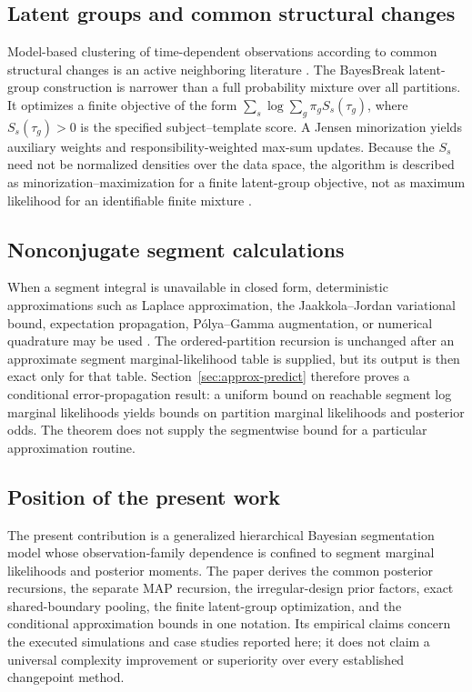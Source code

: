 \subsection{Latent groups and common structural changes}
Model-based clustering of time-dependent observations according to common structural changes is an active neighboring literature \citep{corradin2026commonstructural}. The BayesBreak latent-group construction is narrower than a full probability mixture over all partitions. It optimizes a finite objective of the form $\sum_s\log\sum_g\pi_g S_s(\tau_g)$, where $S_s(\tau_g)>0$ is the specified subject--template score. A Jensen minorization yields auxiliary weights and responsibility-weighted max-sum updates. Because the $S_s$ need not be normalized densities over the data space, the algorithm is described as minorization--maximization for a finite latent-group objective, not as maximum likelihood for an identifiable finite mixture \citep{dempster1977em,teicher1963identifiability}.

\subsection{Nonconjugate segment calculations}
When a segment integral is unavailable in closed form, deterministic approximations such as Laplace approximation, the Jaakkola--Jordan variational bound, expectation propagation, P\'olya--Gamma augmentation, or numerical quadrature may be used \citep{jaakkola2000logisticvb,minka2001ep,polson2013pg}. The ordered-partition recursion is unchanged after an approximate segment marginal-likelihood table is supplied, but its output is then exact only for that table. Section~\ref{sec:approx-predict} therefore proves a conditional error-propagation result: a uniform bound on reachable segment log marginal likelihoods yields bounds on partition marginal likelihoods and posterior odds. The theorem does not supply the segmentwise bound for a particular approximation routine.

\subsection{Position of the present work}
The present contribution is a generalized hierarchical Bayesian segmentation model whose observation-family dependence is confined to segment marginal likelihoods and posterior moments. The paper derives the common posterior recursions, the separate MAP recursion, the irregular-design prior factors, exact shared-boundary pooling, the finite latent-group optimization, and the conditional approximation bounds in one notation. Its empirical claims concern the executed simulations and case studies reported here; it does not claim a universal complexity improvement or superiority over every established changepoint method.

